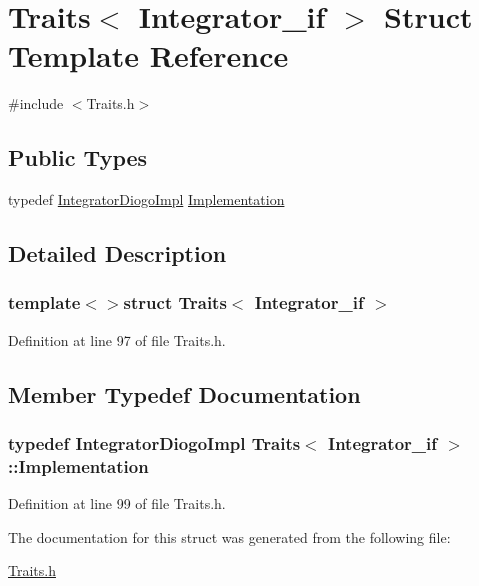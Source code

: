 \hypertarget{struct_traits_3_01_integrator__if_01_4}{\section{Traits$<$ Integrator\-\_\-if $>$ Struct Template Reference}
\label{struct_traits_3_01_integrator__if_01_4}
}


{\ttfamily \#include $<$Traits.\-h$>$}

\subsection*{Public Types}
\begin{DoxyCompactItemize}
\item 
typedef \hyperlink{class_integrator_diogo_impl}{Integrator\-Diogo\-Impl} \hyperlink{struct_traits_3_01_integrator__if_01_4_a769086471264fef36503be109ded8b33}{Implementation}
\end{DoxyCompactItemize}


\subsection{Detailed Description}
\subsubsection*{template$<$$>$struct Traits$<$ Integrator\-\_\-if $>$}



Definition at line 97 of file Traits.\-h.



\subsection{Member Typedef Documentation}
\hypertarget{struct_traits_3_01_integrator__if_01_4_a769086471264fef36503be109ded8b33}{
\subsubsection[{Implementation}]{\setlength{\rightskip}{0pt plus 5cm}typedef {\bf Integrator\-Diogo\-Impl} {\bf Traits}$<$ {\bf Integrator\-\_\-if} $>$\-::{\bf Implementation}}}\label{struct_traits_3_01_integrator__if_01_4_a769086471264fef36503be109ded8b33}


Definition at line 99 of file Traits.\-h.



The documentation for this struct was generated from the following file\-:\begin{DoxyCompactItemize}
\item 
\hyperlink{_traits_8h}{Traits.\-h}\end{DoxyCompactItemize}
